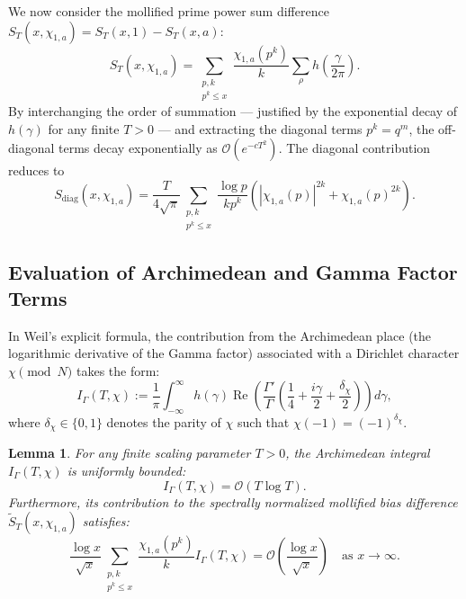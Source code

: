 \documentclass[12pt,reqno]{amsart}
\newtheorem{lemma}[theorem]{Lemma}
\theoremstyle{definition}
\theoremstyle{remark}
\numberwithin{equation}{section}
\begin{document}
We now consider the mollified prime power sum difference $S_T(x, \chi_{1,a}) = S_T(x, 1) - S_T(x, a)$:
\begin{equation}
S_T(x, \chi_{1,a}) = \sum_{\substack{p, k \\ p^k \le x}} \frac{\chi_{1,a}(p^k)}{k} \sum_{\rho} h\left(\frac{\gamma}{2\pi}\right).
\end{equation}
By interchanging the order of summation --- justified by the exponential decay of $h(\gamma)$ for any finite $T > 0$ --- and extracting the diagonal terms $p^k = q^m$, the off-diagonal terms decay exponentially as $\mathcal{O}(e^{-c T^2})$. The diagonal contribution reduces to
\begin{equation}
S_{\text{diag}}(x, \chi_{1,a}) = \frac{T}{4\sqrt{\pi}} \sum_{\substack{p, k \\ p^k \le x}} \frac{\log p}{k p^k} \left( |\chi_{1,a}(p)|^{2k} + \chi_{1,a}(p)^{2k} \right).
\end{equation}

\subsection{Evaluation of Archimedean and Gamma Factor Terms}

In Weil's explicit formula, the contribution from the Archimedean place (the logarithmic derivative of the Gamma factor) associated with a Dirichlet character $\chi \pmod N$ takes the form:
\begin{equation}
I_{\Gamma}(T, \chi) := \frac{1}{\pi} \int_{-\infty}^{\infty} h(\gamma) \operatorname{Re} \left( \frac{\Gamma'}{\Gamma} \left( \frac{1}{4} + \frac{i\gamma}{2} + \frac{\delta_\chi}{2} \right) \right) d\gamma,
\end{equation}
where $\delta_\chi \in \{0, 1\}$ denotes the parity of $\chi$ such that $\chi(-1) = (-1)^{\delta_\chi}$.

\begin{lemma}\label{lem:gamma_bound}
For any finite scaling parameter $T > 0$, the Archimedean integral $I_{\Gamma}(T, \chi)$ is uniformly bounded:
\begin{equation}
I_{\Gamma}(T, \chi) = \mathcal{O}(T \log T).
\end{equation}
Furthermore, its contribution to the  spectrally normalized mollified bias difference 
$\widetilde S_T(x, \chi_{1,a})$ satisfies:
\begin{equation}
\frac{\log x}{\sqrt x}\sum_{\substack{p, k \\ p^k \le x}} \frac{\chi_{1,a}(p^k)}{k} I_{\Gamma}(T, \chi) 
= \mathcal{O}\left(\frac{\log x}{\sqrt x}\right) \quad \text{as } x \to \infty.
\end{equation}
\end{lemma}
\end{document}
